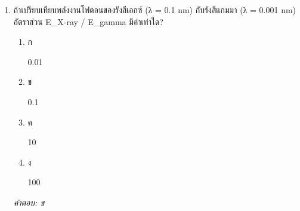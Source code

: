 \documentclass[12pt]{article}
\begin{document}
\begin{enumerate}[label=\arabic*., itemsep=0.5\baselineskip, topsep=0.5\baselineskip, leftmargin=*]
\item ถ้าเปรียบเทียบพลังงานโฟตอนของรังสีเอกซ์ (λ = 0.1 nm) กับรังสีแกมมา (λ = 0.001 nm) อัตราส่วน E\_X-ray / E\_gamma มีค่าเท่าใด?
\begin{enumerate}[label=\alph*)., itemsep=0.3\baselineskip, topsep=0.3\baselineskip]
\item ก\ 
\begin{minipage}[t]{0.9\linewidth}
\raggedright 0.01
\end{minipage}
\item ข\ 
\begin{minipage}[t]{0.9\linewidth}
\raggedright 0.1
\end{minipage}
\item ค\ 
\begin{minipage}[t]{0.9\linewidth}
\raggedright 10
\end{minipage}
\item ง\ 
\begin{minipage}[t]{0.9\linewidth}
\raggedright 100
\end{minipage}
\end{enumerate}
\vspace{-0.3\baselineskip}
\begin{small}
\textit{คำตอบ: ข}
\end{small}

\end{enumerate}
\end{document}
